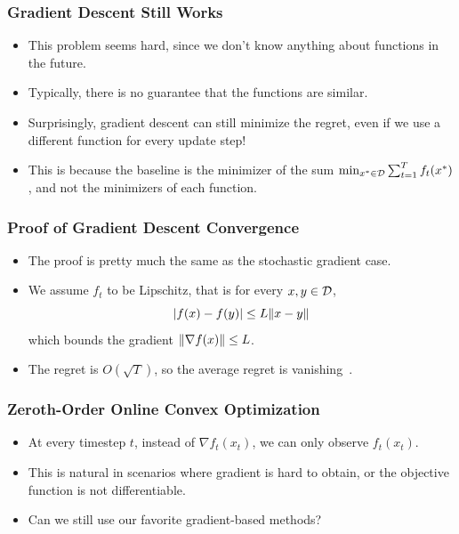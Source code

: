 \documentclass{beamer}
\begin{document}
\begin{frame}
    \frametitle{Gradient Descent Still Works}
    \begin{itemize}
        \item This problem seems hard, since we don't know anything about functions in the future.
        \item Typically, there is no guarantee that the functions are similar.
        \item Surprisingly, gradient descent can still minimize the regret, even if we use a different function for every update step!
        \item This is because the baseline is the minimizer of the sum $\min_{x^* \in \mathcal{D}}\sum_{t=1}^T f_t(x^*)$, and not the minimizers of each function.
    \end{itemize}
\end{frame}

\begin{frame}
    \frametitle{Proof of Gradient Descent Convergence}
    \begin{itemize}
        \item The proof is pretty much the same as the stochastic gradient case.
        \item We assume $f_t$ to be Lipschitz, that is for every $x,y \in \mathcal{D}$,
        \[
            \lvert f(x) - f(y)\rvert \le L\lVert x-y\rVert
        \]
        which bounds the gradient $\lVert\nabla f(x)\rVert \le L$.
        \item The regret is $O(\sqrt{T})$, so the average regret is vanishing~\citep{zinkevich2003online}.
    \end{itemize}
\end{frame}


\begin{frame}
    \frametitle{Zeroth-Order Online Convex Optimization}
    \begin{itemize}
        \item At every timestep $t$, instead of $\nabla f_t(x_t)$, we can only observe $f_t(x_t)$.
        \item This is natural in scenarios where gradient is hard to obtain, or the objective function is not differentiable.
        \item Can we still use our favorite gradient-based methods?
    \end{itemize}
\end{frame}
\end{document}
